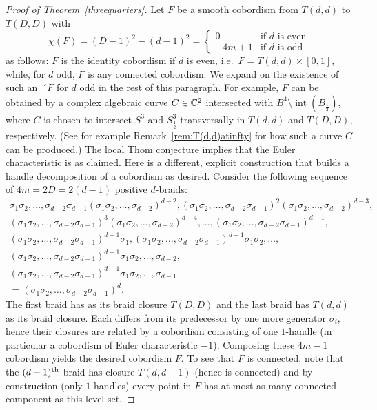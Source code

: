 \documentclass[10pt,a4paper]{article}
\theoremstyle{definition}
\numberwithin{equation}{section}
\DeclareMathOperator{\intt}{int}
\newcommand*\C{\mathbb{C}}
\let\oldin\in
\renewcommand{\in}{\mathchoice{\oldin}{\oldin}{\,\oldin\,}{\,\oldin\,}}
\begin{document}
\begin{proof}[Proof of Theorem~\ref{threequarters}]
Let $F$ be a smooth cobordism from $T(d,d)$ to $T(D,D)$ with
\[
\chi(F)=(D-1)^2-(d-1)^2=
\begin{cases}
0&\text{if $d$ is even}\\
-4m+1&\text{if $d$ is odd}
\end{cases}
\]
as follows: $F$ is the identity cobordism if $d$ is even, i.e.~$F=T(d,d)\times[0,1]$, while, for $d$ odd, $F$ is any connected cobordism. We expand on the existence of such an~´$F$ for $d$ odd in the rest of this paragraph. For example, $F$ can be obtained by a complex algebraic curve $C\in \C^2$ intersected with $B^4\setminus \intt(B_{\frac{1}{2}})$, where $C$ is chosen to intersect $S^3$ and $S^3_{\frac{1}{2}}$ transversally in $T(d,d)$ and $T(D,D)$, respectively. (See for example Remark~\ref{rem:T(d,d)atinfty} for how such a curve $C$ can be produced.) The local Thom conjecture implies that the Euler characteristic is as claimed. Here is a different, explicit construction that builds a handle decomposition of a cobordism as desired. Consider the following sequence of $4m=2D=2(d-1)$ positive $d$-braids:
\begin{align*}
\sigma_1\sigma_2,\dots,\sigma_{d-2}\sigma_{d-1}(\sigma_1\sigma_2,\dots,\sigma_{d-2})^{d-2}, (\sigma_1\sigma_2,\dots,\sigma_{d-2}\sigma_{d-1})^2(\sigma_1\sigma_2,\dots,\sigma_{d-2})^{d-3},\\
(\sigma_1\sigma_2,\dots,\sigma_{d-2}\sigma_{d-1})^3(\sigma_1\sigma_2,\dots,\sigma_{d-2})^{d-4},
\dots,
(\sigma_1\sigma_2,\dots,\sigma_{d-2}\sigma_{d-1})^{d-1},\\ (\sigma_1\sigma_2,\dots,\sigma_{d-2}\sigma_{d-1})^{d-1}\sigma_1,
(\sigma_1\sigma_2,\dots,\sigma_{d-2}\sigma_{d-1})^{d-1}\sigma_1\sigma_2,
\dots,\\
(\sigma_1\sigma_2,\dots,
\sigma_{d-2}\sigma_{d-1})^{d-1}\sigma_1\sigma_2,\dots,
\sigma_{d-2},\\
(\sigma_1\sigma_2,\dots,\sigma_{d-2}\sigma_{d-1})^{d-1}\sigma_1\sigma_2,\dots,
\sigma_{d-1}\\
=(\sigma_1\sigma_2,\dots,\sigma_{d-2}\sigma_{d-1})^{d}.
\end{align*}
The first braid has as its braid closure $T(D,D)$ and the last braid has $T(d,d)$ as its braid closure. Each differs from its predecessor by one more generator $\sigma_i$, hence their closures are related by a cobordism consisting of one $1$-handle (in particular a cobordism of Euler characteristic $-1$). Composing these $4m-1$ cobordism yields the desired cobordism $F$. To see that $F$ is connected, note that the $(d-1)^{\rm th}$ braid has closure $T(d, d-1)$ (hence is connected) and by construction (only $1$-handles) every point in $F$ has at most as many connected component as this level set.


\end{proof}
\end{document}
